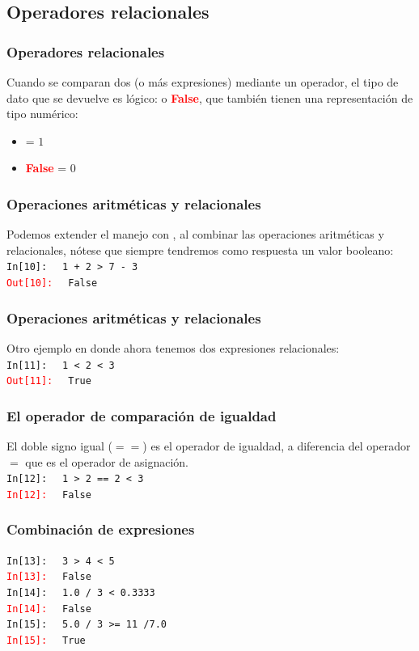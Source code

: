 \documentclass[12pt]{beamer}
\begin{document}
\subsection{Operadores relacionales}

\begin{frame}
\frametitle{Operadores relacionales}
Cuando se comparan dos (o más expresiones) mediante un operador, el tipo de dato que se devuelve es lógico:  o \textcolor{red}{\textbf{False}}, que también tienen una representación de tipo numérico:
\pause
\begin{itemize}
\item[\ding{212}]  = $1$
\item[\ding{212}] \textcolor{red}{\textbf{False}} = $0$
\end{itemize}
\end{frame}
\begin{frame}[fragile]
\frametitle{Operaciones aritméticas y relacionales}
Podemos extender el manejo con \python, al combinar las operaciones aritméticas y relacionales, nótese que siempre tendremos como respuesta un valor booleano:
\\
\bigskip
\textcolor{ao}{\texttt{In[10]: }} \verb| 1 + 2 > 7 - 3| \\
\pause
\textcolor{red}{\texttt{Out[10]: }} \verb| False|
\end{frame}
\begin{frame}[fragile]
\frametitle{Operaciones aritméticas y relacionales}
Otro ejemplo en donde ahora tenemos dos expresiones relacionales:
\\
\bigskip
\textcolor{ao}{\texttt{In[11]: }} \verb| 1 < 2 < 3| \\
\pause
\textcolor{red}{\texttt{Out[11]: }} \verb| True|
\end{frame}
\begin{frame}[fragile]
\frametitle{El operador de comparación de igualdad}
El doble signo igual ($==$) es el operador de igualdad, a diferencia del operador $=$ que es el operador de asignación.
\\[1em]
\textcolor{ao}{\texttt{In[12]: }} \verb| 1 > 2 == 2 < 3| \\
\pause
\textcolor{red}{\texttt{In[12]: }} \verb| False|
\end{frame}
\begin{frame}[fragile]
\frametitle{Combinación de expresiones}
\textcolor{ao}{\texttt{In[13]: }} \verb| 3 > 4 < 5| \\
\pause
\textcolor{red}{\texttt{In[13]: }} \verb| False|
\\
\bigskip
\pause
\textcolor{ao}{\texttt{In[14]: }} \verb| 1.0 / 3 < 0.3333| \\
\pause
\textcolor{red}{\texttt{In[14]: }} \verb| False|
\\
\bigskip
\pause
\textcolor{ao}{\texttt{In[15]: }} \verb| 5.0 / 3 >= 11 /7.0| \\
\pause
\textcolor{red}{\texttt{In[15]: }} \verb| True|
\end{frame}
\end{document}
